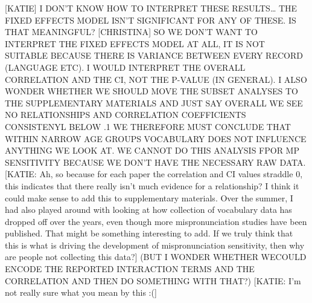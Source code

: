 \documentclass[man]{apa6}
\theoremstyle{definition}
\theoremstyle{definition}
\theoremstyle{definition}
\theoremstyle{remark}
\begin{document}
{[}KATIE{]} I DON'T KNOW HOW TO INTERPRET THESE RESULTS\ldots{} THE
FIXED EFFECTS MODEL ISN'T SIGNIFICANT FOR ANY OF THESE. IS THAT
MEANINGFUL? {[}CHRISTINA{]} SO WE DON'T WANT TO INTERPRET THE FIXED
EFFECTS MODEL AT ALL, IT IS NOT SUITABLE BECAUSE THERE IS VARIANCE
BETWEEN EVERY RECORD (LANGUAGE ETC). I WOULD INTERPRET THE OVERALL
CORRELATION AND THE CI, NOT THE P-VALUE (IN GENERAL). I ALSO WONDER
WHETHER WE SHOULD MOVE THE SUBSET ANALYSES TO THE SUPPLEMENTARY
MATERIALS AND JUST SAY OVERALL WE SEE NO RELATIONSHIPS AND CORRELATION
COEFFICIENTS CONSISTENYL BELOW .1 WE THEREFORE MUST CONCLUDE THAT WITHIN
NARROW AGE GROUPS VOCABULARY DOES NOT INFLUENCE ANYTHING WE LOOK AT. WE
CANNOT DO THIS ANALYSIS FPOR MP SENSITIVITY BECAUSE WE DON'T HAVE THE
NECESSARY RAW DATA. {[}KATIE: Ah, so because for each paper the
correlation and CI values straddle 0, this indicates that there really
isn't much evidence for a relationship? I think it could make sense to
add this to supplementary materials. Over the summer, I had also played
around with looking at how collection of vocabulary data has dropped off
over the years, even though more mispronunciation studies have been
published. That might be something interesting to add. If we truly think
that this is what is driving the development of mispronunciation
sensitivity, then why are people not collecting this data?{]} (BUT I
WONDER WHETHER WECOULD ENCODE THE REPORTED INTERACTION TERMS AND THE
CORRELATION AND THEN DO SOMETHING WITH THAT?) {[}KATIE: I'm not really
sure what you mean by this :({]}
\end{document}
